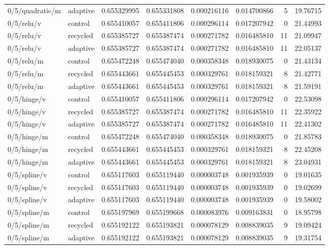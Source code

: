 \begin{longtable}{llrrrrrr}
0/5/quadratic/m & adaptive & 0.655329995 & 0.655331808 & 0.000216116 & 0.014700866 & 5 & 19.76715 \\
0/5/relu/v & control & 0.655410057 & 0.655411806 & 0.000296114 & 0.017207942 & 0 & 21.44993 \\
0/5/relu/v & recycled & 0.655385727 & 0.655387474 & 0.000271782 & 0.016485810 & 11 & 21.09947 \\
0/5/relu/v & adaptive & 0.655385727 & 0.655387474 & 0.000271782 & 0.016485810 & 11 & 22.05137 \\
0/5/relu/m & control & 0.655472248 & 0.655474040 & 0.000358348 & 0.018930075 & 0 & 21.43134 \\
0/5/relu/m & recycled & 0.655443661 & 0.655445453 & 0.000329761 & 0.018159321 & 8 & 21.42771 \\
0/5/relu/m & adaptive & 0.655443661 & 0.655445453 & 0.000329761 & 0.018159321 & 8 & 21.59191 \\
0/5/hinge/v & control & 0.655410057 & 0.655411806 & 0.000296114 & 0.017207942 & 0 & 22.53098 \\
0/5/hinge/v & recycled & 0.655385727 & 0.655387474 & 0.000271782 & 0.016485810 & 11 & 22.35922 \\
0/5/hinge/v & adaptive & 0.655385727 & 0.655387474 & 0.000271782 & 0.016485810 & 11 & 22.41302 \\
0/5/hinge/m & control & 0.655472248 & 0.655474040 & 0.000358348 & 0.018930075 & 0 & 21.85783 \\
0/5/hinge/m & recycled & 0.655443661 & 0.655445453 & 0.000329761 & 0.018159321 & 8 & 22.45208 \\
0/5/hinge/m & adaptive & 0.655443661 & 0.655445453 & 0.000329761 & 0.018159321 & 8 & 23.04931 \\
0/5/spline/v & control & 0.655117603 & 0.655119440 & 0.000003748 & 0.001935939 & 0 & 19.01635 \\
0/5/spline/v & recycled & 0.655117603 & 0.655119440 & 0.000003748 & 0.001935939 & 0 & 19.02699 \\
0/5/spline/v & adaptive & 0.655117603 & 0.655119440 & 0.000003748 & 0.001935939 & 0 & 19.58002 \\
0/5/spline/m & control & 0.655197969 & 0.655199668 & 0.000083976 & 0.009163831 & 0 & 18.95798 \\
0/5/spline/m & recycled & 0.655192122 & 0.655193821 & 0.000078129 & 0.008839035 & 9 & 19.09424 \\
0/5/spline/m & adaptive & 0.655192122 & 0.655193821 & 0.000078129 & 0.008839035 & 9 & 19.31754 \\

\end{longtable}
